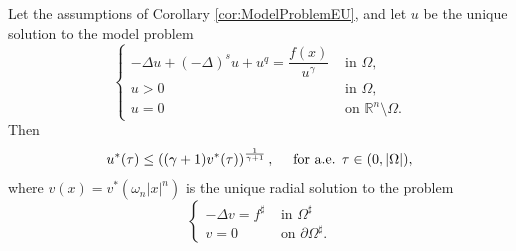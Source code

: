 \documentclass[10pt,a4paper]{amsart}
\begin{document}
\begin{theorem}\label{thm:pointwise_talenti}
Let the assumptions of Corollary \ref{cor:ModelProblemEU}, and let $u$ be the unique solu\-tion to the model problem 
\begin{equation}\label{eq:Model-talenti}
\left\{ \begin{array}{rl}
-\Delta u + (-\Delta)^s u + u^q = \dfrac{f(x)}{u^{\gamma}} & \text{ in } \Omega,\\
u>0 & \text{ in } \Omega,\\
u=0 & \text{ on } \mathbb{R}^{n}\setminus \Omega.
\end{array}\right.
\end{equation}
Then
\begin{equation}\label{th:talenti2}
u^\ast(\tau) \leq\left((\gamma+1)v^\ast(\tau)\right)^{\frac{1}{\gamma+1}}, \quad \text{{\color{red}} for a.e. }\tau \in(0,|\Omega|),
\end{equation}
where $v(x)=v^\ast\left(\omega_n|x|^n\right)$ is the unique radial
solution to the problem
\begin{equation}\label{eq:comp-talenti}
\begin{cases}-\Delta v=f^{\sharp} & \text { in } \Omega^{\sharp} \\ v=0 & \text { on } \partial\Omega^{\sharp} .\end{cases}
\end{equation}
\end{theorem}
\end{document}
